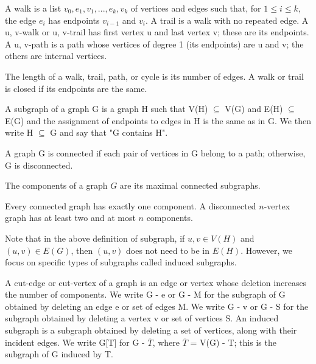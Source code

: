 \begin{definition}
\label{def:walk}
A walk is a list $v_0, e_1, v_1, ..., e_k, v_k$ of vertices and edges such that, for $1 \leq i \leq k$, the edge $e_i$ has endpoints $v_{i-1}$ and $v_i$. A trail is a walk with no repeated edge. A u, v-walk or u, v-trail has first vertex u and last vertex v; these are its endpoints. A u, v-path is a path whose vertices of degree 1 (its endpoints) are u and v; the others are internal vertices.

The length of a walk, trail, path, or cycle is its number of edges. A walk or trail is closed if its endpoints are the same.
\end{definition}

\begin{definition}
\label{def:subgraph}
A subgraph of a graph G is a graph H such that V(H) $\subseteq$ V(G) and E(H) $\subseteq$ E(G) and the assignment of endpoints to edges in H is the same as in G. We then write H $\subseteq$ G and say that "G contains H".

A graph G is connected if each pair of vertices in G belong to a path; otherwise, G is disconnected.
\end{definition}

\begin{definition}
The components of a graph $G$ are its maximal connected subgraphs.
\end{definition}

Every connected graph has exactly one component. A disconnected $n$-vertex graph has at least two and at most $n$ components.

Note that in the above definition of subgraph, if $u, v \in V(H)$ and $(u,v) \in E(G)$, then $(u, v)$ does not need to be in $E(H)$. However, we focus on specific types of subgraphs called induced subgraphs.

\begin{definition}
\label{def:induced_subraph}
A cut-edge or cut-vertex of a graph is an edge or vertex whose deletion increases the number of components. We write G - e or G - M for the subgraph of G obtained by deleting an edge e or set of edges M. We write G - v or G - S for the subgraph obtained by deleting a vertex v or set of vertices S. An induced subgraph is a subgraph obtained by deleting a set of vertices, along with their incident edges. We write G[T] for G - $\overline{T}$, where $\overline{T}$ = V(G) - T; this is the subgraph of G induced by T.
\end{definition}

